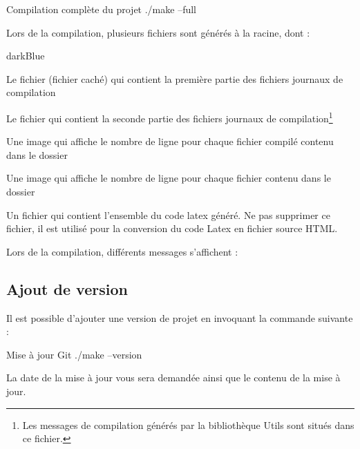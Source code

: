 {\begin{Bash}{Compilation complète du projet}
./make --full
\end{Bash}

Lors de la compilation, plusieurs fichiers sont générés à la racine, dont : 

\begin{items}{darkBlue}{\Triangle}
    \item Le fichier  (fichier caché) qui contient la première partie des fichiers journaux de compilation
    \item Le fichier  qui contient la seconde partie des fichiers journaux de compilation\footnote{Les messages de compilation générés par la bibliothèque Utils sont situés dans ce fichier.}
    \item Une image  qui affiche le nombre de ligne pour chaque fichier compilé contenu dans le dossier 
    \item Une image  qui affiche le nombre de ligne pour chaque fichier contenu dans le dossier 
    \item Un fichier  qui contient l'ensemble du code latex généré. Ne pas supprimer ce fichier, il est utilisé pour la conversion du code Latex en fichier source HTML.
\end{items}

Lors de la compilation, différents messages s'affichent : 


\subsection{Ajout de version}\label{addVersion}

Il est possible d'ajouter une version de projet en invoquant la commande suivante : 

\begin{Bash}{Mise à jour Git}
./make --version
\end{Bash}

La date de la mise à jour vous sera demandée ainsi que le contenu de la mise à jour.

}
